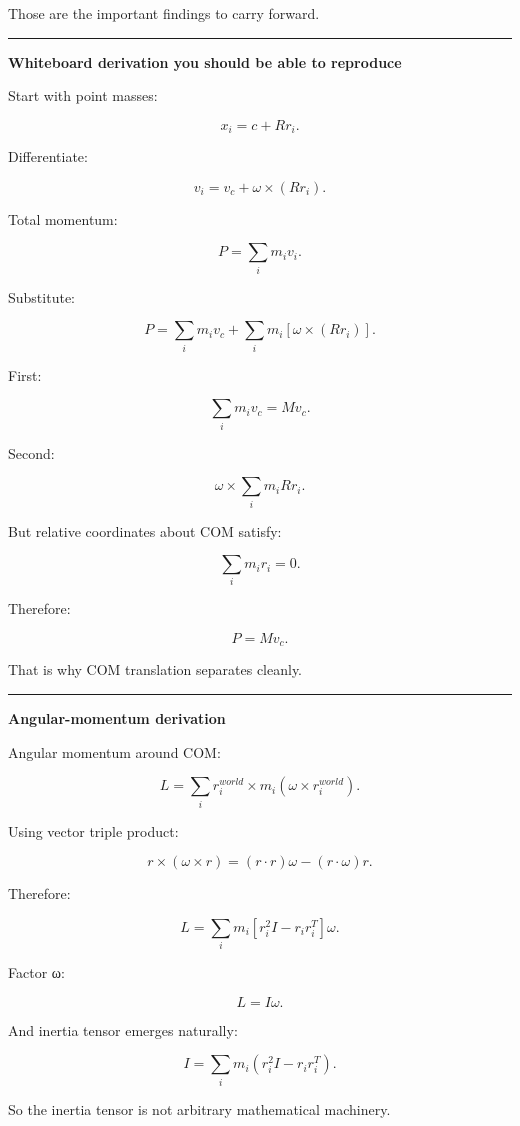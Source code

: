Those are the important findings to carry forward.

\begin{center}\rule{0.5\linewidth}{0.5pt}\end{center}

\textbf{Whiteboard derivation you should be able to reproduce}

Start with point masses:

\[
x_i
=
c+Rr_i.
\]

Differentiate:

\[
v_i
=
v_c+
\omega\times(Rr_i).
\]

Total momentum:

\[
P
=
\sum_i m_iv_i.
\]

Substitute:

\[
P
=
\sum_i m_iv_c
+
\sum_i
m_i
[
\omega\times(Rr_i)
].
\]

First:

\[
\sum_i m_iv_c
=
Mv_c.
\]

Second:

\[
\omega\times
\sum_i m_iRr_i.
\]

But relative coordinates about COM satisfy:

\[
\sum_i m_ir_i=0.
\]

Therefore:

\[
\boxed{
P=Mv_c.
}
\]

That is why COM translation separates cleanly.

\begin{center}\rule{0.5\linewidth}{0.5pt}\end{center}

\textbf{Angular-momentum derivation}

Angular momentum around COM:

\[
L
=
\sum_i
r_i^{world}
\times
m_i
(
\omega\times r_i^{world}
).
\]

Using vector triple product:

\[
r\times(\omega\times r)
=
(r\cdot r)\omega
-
(r\cdot\omega)r.
\]

Therefore:

\[
L
=
\sum_i
m_i
[
r_i^2I-r_ir_i^T
]
\omega.
\]

Factor ω:

\[
L=
I\omega.
\]

And inertia tensor emerges naturally:

\[
\boxed{
I=
\sum_i
m_i
(
r_i^2I-r_ir_i^T
).
}
\]

So the inertia tensor is not arbitrary mathematical machinery.


